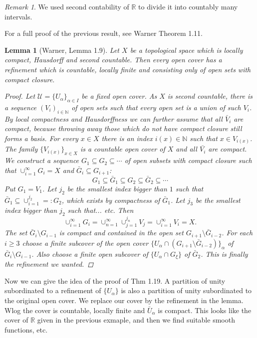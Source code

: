 \documentclass[11pt,A4]{article}
\theoremstyle{plain}
\newtheorem{lm}[thm]{Lemma}
\theoremstyle{definition}
\theoremstyle{remark}
\newtheorem{rem}[thm]{Remark}
\newcommand{\N}{\mathbb{N}}
\newcommand{\R}{\mathbb{R}}
\newcommand{\1}{\mathbbm{1}}
\newcommand{\U}{\mathcal{U}}
\newcommand{\sub}{\subseteq}
\begin{document}
\begin{rem}
    We used second contability of $\R$ to divide it into countably many intervals.
\end{rem}

For a full proof of the previous result, see Warner Theorem 1.11.

\begin{lm}[Warner, Lemma 1.9]
    Let $X$ be a topological space which is locally compact, Hausdorff and second countable.
    Then every open cover has a refinement which is countable, locally finite and consisting only of open sets with compact closure.
    \begin{proof}
	Let $\U=\{U_{\alpha}\}_{\alpha\in I}$ be a fixed open cover.
	As $X$ is second countable, there is a sequence $(V_{i})_{i\in \N}$ of open sets such that every open set is a union of such $V_{i}$.
	By local compactness and Hausdorffness we can further assume that all $\bar{V}_{i}$ are compact, because throwing away those which do not have compact closure still forms a basis.
	For every $x\in X$ there is an index $i(x)\in \N$ such that $x\in V_{i(x)}$.
	The family $\{V_{i(x)}\}_{x\in X}$ is a countable open cover of $X$ and all $\bar{V_{i}}$ are compact.
	We construct a sequence $G_{1}\sub G_{2}\sub \cdots $ of open subsets with compact closure such that $\cup_{i=1}^{\infty}G_{i}=X$ and $\bar{G}_{i}\sub G_{i+1}$:
	\[ G_{1}\sub \bar{G}_{1}\sub G_{2}\sub \bar{G}_{2}\sub \cdots \]
	Put $G_{1}=V_{1}$.
	Let $j_{2}$ be the smallest index bigger than $1$ such that $\bar{G}_{1}\sub \cup_{i=1}^{j_{2}}=:G_{2}$, which exists by compactness of $\bar{G}_{1}$.
	Let $j_{3}$ be the smallest index bigger than $j_{2}$ such that... etc.
	Then
	\[ \cup_{i=1}^{\infty}G_{i}=\cup_{n=1}^{\infty}\cup_{j=1}^{j_{n}}V_{j}=\cup_{i=1}^{\infty}V_{i}=X.\]
	The set $\bar{G}_{i}\setminus G_{i-1}$ is compact and contained in the open set $G_{i+1}\setminus \bar{G}_{i-2}$.
	For each $i\geqslant 3$ choose a finite subcover of the open cover $\{U_{\alpha}\cap (G_{i+1}\setminus \bar{G}_{i-2})\}_{\alpha}$ of $\bar{G}_{i}\setminus G_{i-1}$.
	Also choose a finite open subcover of $\{U_{\alpha} \cap G_{\xi}\}$ of $\bar{G}_{2}$.
	This is finally the refinement we wanted.
    \end{proof}
\end{lm}

Now we can give the idea of the proof of Thm 1.19.
A partition of unity subordinated to a refinement of $\{U_{\alpha}\}$ is also a partition of unity subordinated to the original open cover.
We replace our cover by the refinement in the lemma.
Wlog the cover is countable, locally finite and $\bar{U}_{\alpha}$ is compact.
This looks like the cover of $\R$ given in the previous exmaple, and then we find suitable smooth functions, etc.
\end{document}
